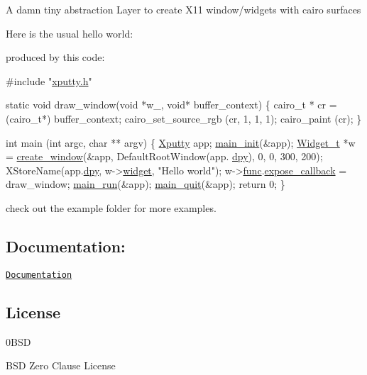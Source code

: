 A damn tiny abstraction Layer to create X11 window/widgets with cairo surfaces

Here is the usual hello world\+:



produced by this code\+:


\begin{DoxyCode}
\textcolor{preprocessor}{#include "\hyperlink{xputty_8h}{xputty.h}"}

\textcolor{keyword}{static} \textcolor{keywordtype}{void} draw\_window(\textcolor{keywordtype}{void} *w\_, \textcolor{keywordtype}{void}* buffer\_context) \{
    cairo\_t * cr = (cairo\_t*) buffer\_context;
    cairo\_set\_source\_rgb (cr, 1, 1, 1);
    cairo\_paint (cr);
\}

\textcolor{keywordtype}{int} main (\textcolor{keywordtype}{int} argc, \textcolor{keywordtype}{char} ** argv)
\{
    \hyperlink{structXputty}{Xputty} app;
    \hyperlink{xputty_8c_a484645d624d9e9eff0288f8d5583ff5e}{main\_init}(&app);
    \hyperlink{structWidget__t}{Widget\_t} *w = \hyperlink{xwidget_8c_a5528f841e6b5f2ef62b3b10bfa8bf20f}{create\_window}(&app, DefaultRootWindow(app.
      \hyperlink{structXputty_ab185ae4fd00ee1930c61e0440734878f}{dpy}), 0, 0, 300, 200);
    XStoreName(app.\hyperlink{structXputty_ab185ae4fd00ee1930c61e0440734878f}{dpy}, w->\hyperlink{structWidget__t_acb2bfb41674371ee1220a9d6a2d89fb1}{widget}, \textcolor{stringliteral}{"Hello world"});
    w->\hyperlink{structWidget__t_a225b9a175e132994a5aa73b59a2911ad}{func}.\hyperlink{structFunc__t_ae4ba307ec29bfea83e1197aa750c1396}{expose\_callback} = draw\_window;
    \hyperlink{xputty_8c_abb548ea64f852a7c94473a595e67d69f}{main\_run}(&app);
    \hyperlink{xputty_8c_a0d4eda902b4de6f7a30e8d869f842fda}{main\_quit}(&app);
    \textcolor{keywordflow}{return} 0;
\}
\end{DoxyCode}


check out the example folder for more examples.

\subsection*{Documentation\+:}

\href{https://brummer10.github.io/Xputty/html/index.html}{\tt Documentation}

\subsection*{License}

\begin{DoxyVerb}     0BSD 
\end{DoxyVerb}
 B\+SD Zero Clause License 